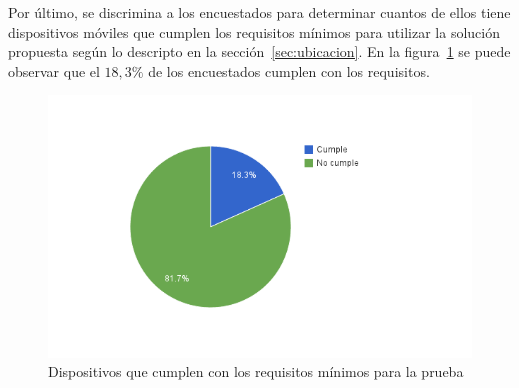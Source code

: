 Por último, se discrimina a los encuestados para determinar cuantos de ellos tiene dispositivos
móviles que cumplen los requisitos mínimos para utilizar la solución propuesta según lo descripto
en la sección~\ref{sec:ubicacion}. En la figura~\ref{fig:ubicacion_requisitos_minimos} se puede 
observar que el $18,3\%$ de los encuestados cumplen con los requisitos.

\begin{figure}[ht!]
\centering
\includegraphics[scale=0.8]{resultados/imagenes/ubicacion_requisitos_minimos.png}
\caption{Dispositivos que cumplen con los requisitos mínimos para la prueba}
\label{fig:ubicacion_requisitos_minimos}
\end{figure}
